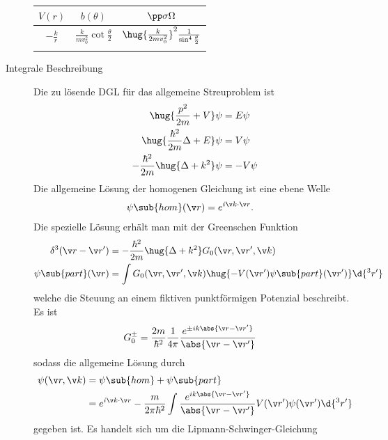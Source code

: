 \documentclass[twocolumn]{summery_4.1}
\begin{document}
\begin{description}
    \begin{center}
    \begin{tabular}{@{}ccc@{}}
        \toprule
        \(V(r)\) & \(b(\theta)\) & \(\pp \sigma\Omega\) \\
        \midrule
        \(-\frac k {r}\)& \(\frac{k}{m v_0^2}\cot\frac\theta2\) & \(\hug{\frac{k}{2 m v_0^2}}^2 \frac{1}{\sin^4 \frac\theta 2}\)\\
        & \\
        \bottomrule
    \end{tabular}
    \end{center}
    \item[Integrale Beschreibung]
    Die zu lösende DGL für das allgemeine Streuproblem ist 
    \begin{align*}
        \hug{\frac{p^2}{2m} + V} \psi &= E\psi\\
        \hug{\frac{\hbar^2}{2m}\Delta + E} \psi &= V\psi\\
        -\frac{\hbar^2}{2m}\hug{\Delta + k^2} \psi &= -V\psi
    \end{align*}
    Die allgemeine Lösung der homogenen Gleichung ist eine ebene Welle 
    \begin{align*}
        \psi\sub{hom}(\v r) &= e^{i\v k\cdot \v r}.
    \end{align*}
    Die spezielle Lösung erhält man mit der Greenschen Funktion 
    \begin{align*}
        \delta^3 (\v r - \v r' ) &= -\frac{\hbar^2}{2m}\hug{\Delta + k^2} G_0(\v r, \v r', \v k)\\
        \psi\sub{part}(\v r) &= \int G_0(\v r, \v r', \v k) \hug{-V(\v r')\psi\sub{part}(\v r')} \d{^3r'}
    \end{align*} 
    welche die Steuung an einem fiktiven punktförmigen Potenzial beschreibt. Es ist 
    \begin{align*}
        G_0^\pm &= \frac{2m}{\hbar^2} \frac1{4\pi} \frac{e^{\pm ik \abs{\v r - \v r'}}}{\abs{\v r - \v r'}}
    \end{align*}
    sodass die allgemeine Lösung durch
    \begin{align*}
        \psi(\v r,\v k) &= \psi\sub{hom} + \psi\sub{part}\\
        &= e^{i\v k\cdot \v r} -   \frac{m}{2\pi\hbar^2}  \int  \frac{e^{ik \abs{\v r - \v r'}}}{\abs{\v r - \v r'}} V(\v r') \psi(\v r')\d{^3r'}
   \end{align*}
    gegeben ist. Es handelt sich um die Lipmann-Schwinger-Gleichung


\end{description}
\end{document}
